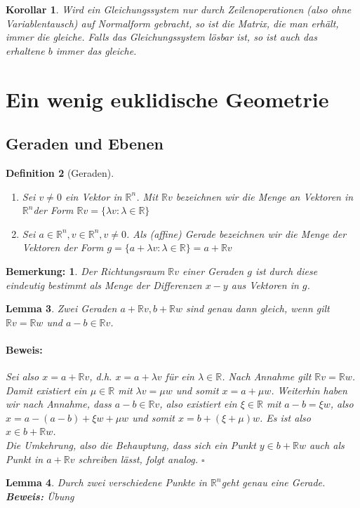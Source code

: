 \documentclass{report}
\newcommand{\IN}[1]{\index{#1|BH}}
\newcommand{\lb}{\lambda}
\newcommand{\R}{\mathbb{R}}
\newcommand{\Rn}{\mathbb{R}^n}
\newcommand{\mRn}{$\mathbb{R}^n$}
\theoremstyle{customrem}
\newtheorem*{bem}{Bemerkung\textnormal:}
\theoremstyle{customdef}
\newtheorem{definition}{Definition}[chapter]
\newtheorem{lemma}[definition]{Lemma}
\newtheorem{korrolar}[definition]{Korollar}
\renewenvironment{proof}{\vspace{-.75cm}\paragraph{Beweis: }}{\vspace{-.5cm}\hfill$\square$}
\begin{document}
	\vspace{.2cm}
	\begin{korrolar}
		Wird ein Gleichungssystem \textit{nur} durch Zeilenoperationen (also ohne Variablentausch) auf Normalform gebracht, so ist die Matrix, die man erhält, immer die gleiche. Falls das Gleichungssystem lösbar ist, so ist auch das erhaltene $b$ immer das gleiche.
	\end{korrolar}

\section{Ein wenig euklidische Geometrie}

\subsection{Geraden und Ebenen}

	\begin{definition}[Geraden]
		\IN{Gerade}
		$ $\vspace{-.5cm}
		\begin{enumerate}
			\item Sei $v \not= 0$ ein Vektor in \mRn. Mit $\R v$ bezeichnen wir die Menge an Vektoren in \mRn der Form $\R v = \{\lb v : \lb \in \R\}$
			\item Sei $a \in \Rn, v \in \Rn, v \neq 0$. Als (affine) Gerade bezeichnen wir die Menge der Vektoren der Form $g = \{a + \lb v : \lb \in \R\} = a + \R v$
		\end{enumerate}
	\end{definition}
	
	\begin{bem}
		Der Richtungsraum $\R v$ einer Geraden $g$ ist durch diese eindeutig bestimmt als Menge der Differenzen $x - y$ aus Vektoren in $g$.
	\end{bem}
	
	\begin{lemma}
		\IN{Gerade!Gleichheit}
		Zwei Geraden $a + \R v, b + \R w$ sind genau dann gleich, wenn gilt $\R v = \R w$ und $a - b \in \R v$.\\
		\begin{proof}
			Sei also  $x = a + \R v$, d.h. $x = a + \lb v$ für ein $\lb \in \R$. Nach Annahme gilt $\R v = \R w$. Damit existiert ein $\mu \in \R$ mit $\lb v = \mu w$ und somit $x = a + \mu w$. Weiterhin haben wir nach Annahme, dass $a-b \in \R v$, also existiert ein $\xi \in \R$ mit $a - b = \xi w$, also $x = a - (a - b) + \xi w + \mu w$ und somit $x = b + (\xi + \mu) w$.
			Es ist also $x \in b + \R w$.\\
			Die Umkehrung, also die Behauptung, dass sich ein Punkt $y \in b + \R w$ auch als Punkt in $a + \R v$ schreiben lässt, folgt analog.
		\end{proof}
	\end{lemma}
	\vspace{.2cm}
	\begin{lemma}
		Durch zwei verschiedene Punkte in \mRn geht genau eine Gerade.\\
		\textbf{Beweis: } Übung
	\end{lemma}
\end{document}
